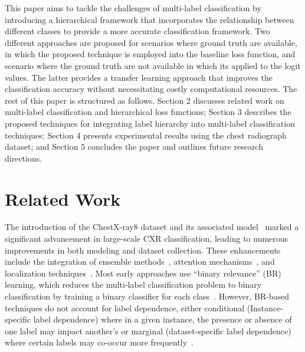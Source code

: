 This paper aims to tackle the challenges of multi-label classification by introducing a hierarchical framework that incorporates the relationship between different classes to provide a more accurate classification framework. Two different approaches are proposed for scenarios where ground truth are available, in which the proposed technique is employed into the baseline loss function, and scenario where the ground truth are not available in which its applied to the logit values. The latter provides a transfer learning approach that improves the classification accuracy without necessitating costly computational resources. The rest of this paper is structured as follows. Section 2 discusses related work on multi-label classification and hierarchical loss functions; Section 3 describes the proposed techniques for integrating label hierarchy into multi-label classification techniques; Section 4 presents experimental results using the chest radiograph dataset; and Section 5 concludes the paper and outlines future research directions.

\section{Related Work}

The introduction of the ChestX-ray8 dataset and its associated model~\cite{wang_ChestXRay8_2017} marked a significant advancement in large-scale CXR classification, leading to numerous improvements in both modeling and dataset collection. These enhancements include the integration of ensemble methods~\cite{islam_Abnormality_2017}, attention mechanisms~\cite{guan_Diagnose_2018,liu_SDFN_2019}, and localization techniques~\cite{cai_Iterative_2018,guendel_MultiTask_2019,li_Thoracic_2018,yan_Weakly_2018}. Most early approaches use ``binary relevance'' (BR) learning, which reduces the multi-label classification problem to binary classification by training a binary classifier for each class~\cite{zhang_Review_2014}. However, BR-based techniques do not account for label dependence, either conditional (Instance-specific label dependence) where in a given instance, the presence or absence of one label may impact another's or marginal (dataset-specific label dependence) where certain labels may co-occur more frequently~\cite{dembczynski_Label_2012}.

